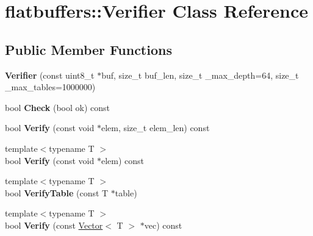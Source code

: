 \hypertarget{classflatbuffers_1_1Verifier}{}\section{flatbuffers\+:\+:Verifier Class Reference}
\label{classflatbuffers_1_1Verifier}
\subsection*{Public Member Functions}
\begin{DoxyCompactItemize}
\item 
\mbox{\label{classflatbuffers_1_1Verifier_ab2305df3b2b5acb37c098717cdd6a0cd}} 
{\bfseries Verifier} (const uint8\+\_\+t $\ast$buf, size\+\_\+t buf\+\_\+len, size\+\_\+t \+\_\+max\+\_\+depth=64, size\+\_\+t \+\_\+max\+\_\+tables=1000000)
\item 
\mbox{\label{classflatbuffers_1_1Verifier_a79b25f008e45267bd0ecc5bf04f0c039}} 
bool {\bfseries Check} (bool ok) const
\item 
\mbox{\label{classflatbuffers_1_1Verifier_a8ce7a2a34b689373ee0be64e2be1aa0d}} 
bool {\bfseries Verify} (const void $\ast$elem, size\+\_\+t elem\+\_\+len) const
\item 
\mbox{\label{classflatbuffers_1_1Verifier_aa58747df9e576de03629ea893cd50518}} 
{\footnotesize template$<$typename T $>$ }\\bool {\bfseries Verify} (const void $\ast$elem) const
\item 
\mbox{\label{classflatbuffers_1_1Verifier_abcfa876728853d9f8d7175dbfed6c112}} 
{\footnotesize template$<$typename T $>$ }\\bool {\bfseries Verify\+Table} (const T $\ast$table)
\item 
\mbox{\label{classflatbuffers_1_1Verifier_af93c8057309f28e2bcdcc31feee4f5de}} 
{\footnotesize template$<$typename T $>$ }\\bool {\bfseries Verify} (const \hyperlink{classflatbuffers_1_1Vector}{Vector}$<$ T $>$ $\ast$vec) const
\item 

\end{DoxyCompactItemize}
